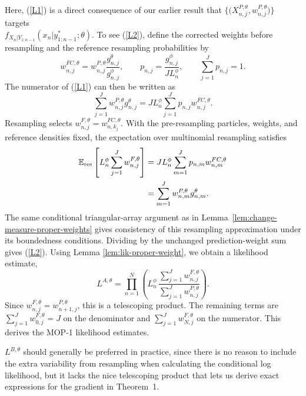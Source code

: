\documentclass[11pt]{article}
\newcommand\thmMopFunctionalForms{1}
\theoremstyle{thmstylethree}%
\begin{document}
Here, (\ref{L1}) is a direct consequence of our earlier result that $\{ \big(X^{P,\theta}_{n,j},w^{P,\theta}_{n,j}\big) \}$ targets\\
$f_{X_{n}|Y_{1:n-1}}(x_{n}|y^*_{1:n-1};\theta)$.
To see (\ref{L2}), define the corrected weights before resampling and the
reference resampling probabilities by
\begin{equation}
w_{n,j}^{FC,\theta}
=w_{n,j}^{P,\theta}\frac{g_{n,j}^\theta}{g_{n,j}^\phi},
\qquad
p_{n,j}=\frac{g_{n,j}^\phi}{JL_n^\phi},
\qquad \sum_{j=1}^Jp_{n,j}=1.
\end{equation}
The numerator of (\ref{L1}) can then be written as
\begin{equation}
\sum_{j=1}^Jw_{n,j}^{P,\theta}g_{n,j}^\theta
=JL_n^\phi\sum_{j=1}^Jp_{n,j}w_{n,j}^{FC,\theta}.
\end{equation}
Resampling selects $w_{n,j}^{F,\theta}=w_{n,k_j}^{FC,\theta}$.
With the pre-resampling particles, weights, and reference densities fixed,
the expectation over multinomial resampling satisfies
\begin{align}
\mathbb{E}_{\mathrm{res}}\left[L_n^\phi\sum_{j=1}^Jw_{n,j}^{F,\theta}\right]
&=JL_n^\phi\sum_{m=1}^Jp_{n,m}w_{n,m}^{FC,\theta} \notag\\*
&=\sum_{m=1}^Jw_{n,m}^{P,\theta}g_{n,m}^\theta.
\end{align}
The same conditional triangular-array argument as in
Lemma~\ref{lem:change-measure-proper-weights} gives consistency of this
resampling approximation under its boundedness conditions. Dividing by
the unchanged prediction-weight sum gives (\ref{L2}).
Using Lemma \ref{lem:lik-proper-weight}, we obtain a likelihood estimate,
\begin{equation}
L^{A,\theta} = \prod_{n=1}^N \left( L^\phi_n \, \frac{\sum_{j=1}^J w^{F,\theta}_{n,j}}{\sum_{j=1}^J w^{P,\theta}_{n,j}}\right).
\end{equation}
Since $w^{F,\theta}_{n,j}=w^{P,\theta}_{n+1,j}$, this is a telescoping product. The remaining terms are
$\sum_{j=1}^J w^{F,\theta}_{0,j} = J$ on the denominator and $\sum_{j=1}^J w^{F,\theta}_{N,j}$ on the numerator.
This derives the MOP-1 likelihood estimates.


$L^{B,\theta}$ should generally be preferred in practice, since there is no reason to include the extra variability from resampling when calculating the conditional log likelihood, but it lacks the nice telescoping product that lets us derive exact expressions for the gradient in Theorem~\thmMopFunctionalForms.
\end{document}

